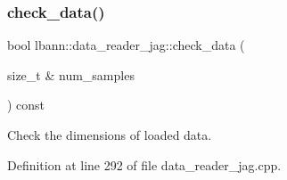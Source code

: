 \subsubsection{\texorpdfstring{check\+\_\+data()}{check\_data()}}
{\footnotesize\ttfamily bool lbann\+::data\+\_\+reader\+\_\+jag\+::check\+\_\+data (\begin{DoxyParamCaption}\item[{size\+\_\+t \&}]{num\+\_\+samples }\end{DoxyParamCaption}) const\hspace{0.3cm}{\ttfamily [protected]}}



Check the dimensions of loaded data. 



Definition at line 292 of file data\+\_\+reader\+\_\+jag.\+cpp.


